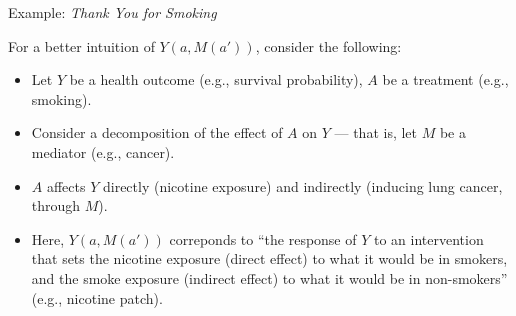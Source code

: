 \documentclass[12pt,t]{beamer}
\begin{document}

\begin{frame}[c]{Example: \textit{Thank You for Smoking}}

For a better intuition of $Y(a, M(a'))$, consider the following:

\begin{center}
\begin{itemize}
  \itemsep4pt
  \item Let $Y$ be a health outcome (e.g., survival probability), $A$ be a
    treatment (e.g., smoking).
  \item Consider a decomposition of the effect of $A$ on $Y$ --- that is, let
    $M$ be a mediator (e.g., cancer).
  \item $A$ affects $Y$ directly (nicotine exposure) and indirectly (inducing
    lung cancer, through $M$).
  \item Here, $Y(a, M(a'))$ correponds to ``the response of $Y$ to an
    intervention that sets the nicotine exposure (direct effect) to what it
    would be in smokers, and the smoke exposure (indirect effect) to what it
    would be in non-smokers'' (e.g., nicotine patch).
\end{itemize}
\end{center}

\note{
}

\end{frame}

\end{document}

